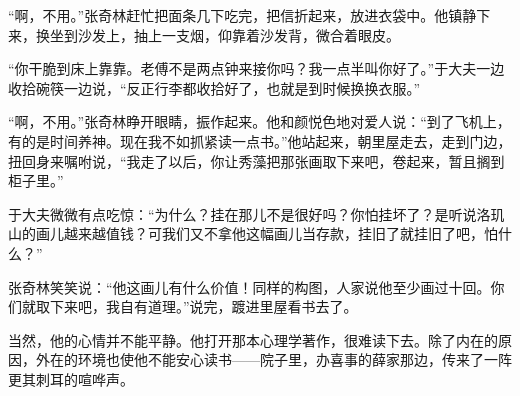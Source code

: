 \par “啊，不用。”张奇林赶忙把面条几下吃完，把信折起来，放进衣袋中。他镇静下来，换坐到沙发上，抽上一支烟，仰靠着沙发背，微合着眼皮。
\par “你干脆到床上靠靠。老傅不是两点钟来接你吗？我一点半叫你好了。”于大夫一边收拾碗筷一边说，“反正行李都收拾好了，也就是到时候换换衣服。”
\par “啊，不用。”张奇林睁开眼睛，振作起来。他和颜悦色地对爱人说：“到了飞机上，有的是时间养神。现在我不如抓紧读一点书。”他站起来，朝里屋走去，走到门边，扭回身来嘱咐说，“我走了以后，你让秀藻把那张画取下来吧，卷起来，暂且搁到柜子里。”
\par 于大夫微微有点吃惊：“为什么？挂在那儿不是很好吗？你怕挂坏了？是听说洛玑山的画儿越来越值钱？可我们又不拿他这幅画儿当存款，挂旧了就挂旧了吧，怕什么？”
\par 张奇林笑笑说：“他这画儿有什么价值！同样的构图，人家说他至少画过十回。你们就取下来吧，我自有道理。”说完，踱进里屋看书去了。
\par 当然，他的心情并不能平静。他打开那本心理学著作，很难读下去。除了内在的原因，外在的环境也使他不能安心读书——院子里，办喜事的薛家那边，传来了一阵更其刺耳的喧哗声。


